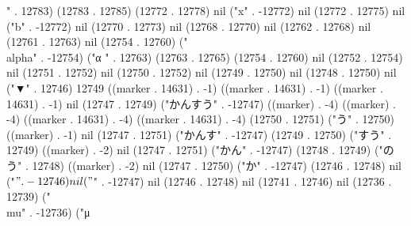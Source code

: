 " . 12783) (12783 . 12785) (12772 . 12778) nil ("x" . -12772) nil (12772 . 12775) nil ("b" . -12772) nil (12770 . 12773) nil (12768 . 12770) nil (12762 . 12768) nil (12761 . 12763) nil (12754 . 12760) ("\\alpha" . -12754) ("α
" . 12763) (12763 . 12765) (12754 . 12760) nil (12752 . 12754) nil (12751 . 12752) nil (12750 . 12752) nil (12749 . 12750) nil (12748 . 12750) nil ("▼" . 12746) 12749 ((marker . 14631) . -1) ((marker . 14631) . -1) ((marker . 14631) . -1) nil (12747 . 12749) ("かんすう" . -12747) ((marker) . -4) ((marker) . -4) ((marker . 14631) . -4) ((marker . 14631) . -4) (12750 . 12751) ("う" . 12750) ((marker) . -1) nil (12747 . 12751) ("かんす" . -12747) (12749 . 12750) ("すう" . 12749) ((marker) . -2) nil (12747 . 12751) ("かん" . -12747) (12748 . 12749) ("のう" . 12748) ((marker) . -2) nil (12747 . 12750) ("か" . -12747) (12746 . 12748) nil ("$" . -12746) nil ("$" . -12747) nil (12746 . 12748) nil (12741 . 12746) nil (12736 . 12739) ("\\mu" . -12736) ("μ

